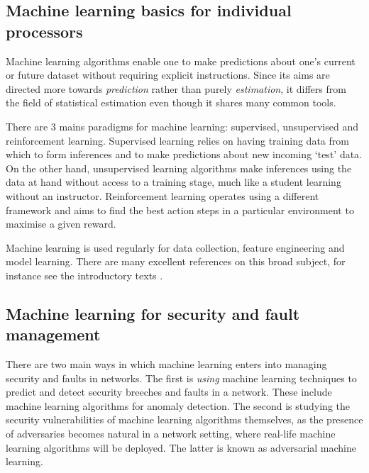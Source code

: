 \documentclass[twocolumn, aps, rmp, amsmath, amssymb, nofootinbib, superscriptaddress, longbibliography, floatfix, table-of-contents, eqsecnum]{revtex4-2}
\begin{document}
\subsection{Machine learning basics for individual processors}
Machine learning algorithms enable one to make predictions about one's current or future dataset without requiring explicit instructions. Since its aims are directed more towards \textit{prediction} rather than purely \textit{estimation}, it differs from the field of statistical estimation even though it shares many common tools.

There are 3 mains paradigms for machine learning: supervised, unsupervised and reinforcement learning. Supervised learning relies on having training data from which to form inferences and to make predictions about new incoming `test' data. On the other hand, unsupervised learning algorithms make inferences using the data at hand without access to a training stage, much like a student learning without an instructor. Reinforcement learning operates using a different framework and aims to find the best action steps in a particular environment to maximise a given reward.

Machine learning is used regularly for data collection, feature engineering and model learning. There are many excellent references on this broad subject, for instance see the introductory texts \cite{bishop2006pattern, shalev2014understanding, trevor2009elements, marsland2011machine, flach2012machine}.


\subsection{Machine learning for security and fault management}
There are two main ways in which  machine learning enters into managing security and faults in networks. The first is \textit{using} machine learning techniques to predict and detect security breeches and faults in a network. These include machine learning algorithms for anomaly detection. The second is studying the security vulnerabilities of machine learning algorithms themselves, as the presence of adversaries becomes natural in a network setting, where real-life machine learning algorithms will be deployed. The latter is known as adversarial machine learning.
\end{document}
